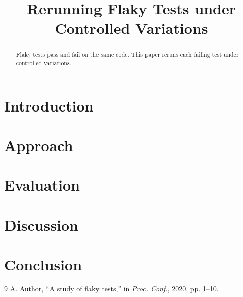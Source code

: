 \documentclass[10pt,conference]{IEEEtran}
\begin{document}
\title{Rerunning Flaky Tests under Controlled Variations}
\author{}
\maketitle
\begin{abstract}
Flaky tests pass and fail on the same code. This paper reruns each failing test under controlled variations.
\end{abstract}
\section{Introduction}

\section{Approach}

\section{Evaluation}

\section{Discussion}

\section{Conclusion}

\begin{thebibliography}{9}
 A. Author, ``A study of flaky tests,'' in \emph{Proc. Conf.}, 2020, pp. 1--10.
\end{thebibliography}
\end{document}
